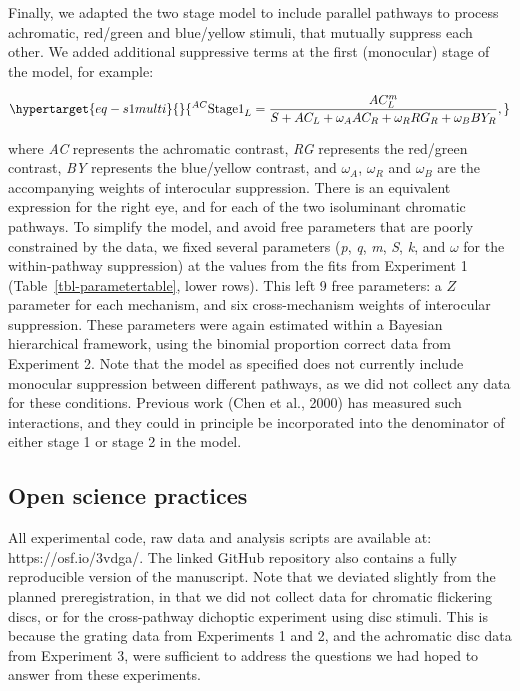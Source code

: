 \documentclass[
  letterpaper,
  DIV=11,
  numbers=noendperiod]{scrartcl}
\begin{document}
Finally, we adapted the two stage model to include parallel pathways to
process achromatic, red/green and blue/yellow stimuli, that mutually
suppress each other. We added additional suppressive terms at the first
(monocular) stage of the model, for example:

\begin{equation}\protect\hypertarget{eq-s1multi}{}{^{AC}\mathrm{Stage1}_L = \frac{AC_L^m}{S + AC_L + \omega_A AC_R + \omega_R RG_R + \omega_B BY_R},}\label{eq-s1multi}\end{equation}

where \emph{AC} represents the achromatic contrast, \emph{RG} represents
the red/green contrast, \emph{BY} represents the blue/yellow contrast,
and \(\omega_A\), \(\omega_R\) and \(\omega_B\) are the accompanying
weights of interocular suppression. There is an equivalent expression
for the right eye, and for each of the two isoluminant chromatic
pathways. To simplify the model, and avoid free parameters that are
poorly constrained by the data, we fixed several parameters (\emph{p},
\emph{q}, \emph{m}, \emph{S}, \emph{k}, and \(\omega\) for the
within-pathway suppression) at the values from the fits from Experiment
1 (Table~\ref{tbl-parametertable}, lower rows). This left 9 free
parameters: a \(Z\) parameter for each mechanism, and six
cross-mechanism weights of interocular suppression. These parameters
were again estimated within a Bayesian hierarchical framework, using the
binomial proportion correct data from Experiment 2. Note that the model
as specified does not currently include monocular suppression between
different pathways, as we did not collect any data for these conditions.
Previous work (Chen et al., 2000) has measured such interactions, and
they could in principle be incorporated into the denominator of either
stage 1 or stage 2 in the model.

\hypertarget{open-science-practices}{%
\subsection{Open science practices}\label{open-science-practices}}

All experimental code, raw data and analysis scripts are available at:
https://osf.io/3vdga/. The linked GitHub repository also contains a
fully reproducible version of the manuscript. Note that we deviated
slightly from the planned preregistration, in that we did not collect
data for chromatic flickering discs, or for the cross-pathway dichoptic
experiment using disc stimuli. This is because the grating data from
Experiments 1 and 2, and the achromatic disc data from Experiment 3,
were sufficient to address the questions we had hoped to answer from
these experiments.
\end{document}
